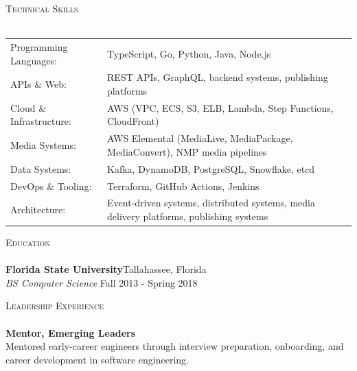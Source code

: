 \documentclass[a4paper]{article}
\newcommand{\lineunder} {
    \vspace*{-8pt} \\
    \hspace*{-18pt} \hrulefill \\
}
\newcommand{\header} [1] {
    {\hspace*{-18pt}\vspace*{6pt} \textsc{#1}}
    \vspace*{-6pt} \lineunder
}
\begin{document}
\header{Technical Skills}
\vspace{1mm}
\begin{tabular}{ l l }
    Programming Languages:      & TypeScript, Go, Python, Java, Node.js \\
    APIs \& Web:                & REST APIs, GraphQL, backend systems, publishing platforms \\
    Cloud \& Infrastructure:    & AWS (VPC, ECS, S3, ELB, Lambda, Step Functions, CloudFront) \\
    Media Systems:              & AWS Elemental (MediaLive, MediaPackage, MediaConvert), NMP media pipelines \\
    Data Systems:               & Kafka, DynamoDB, PostgreSQL, Snowflake, etcd \\
    DevOps \& Tooling:          & Terraform, GitHub Actions, Jenkins \\
    Architecture:               & Event-driven systems, distributed systems, media delivery platforms, publishing systems \\
\end{tabular}

\vspace{3mm}

\header{Education}
\textbf{Florida State University}\hfill Tallahassee, Florida\\
{\textit {BS Computer Science}} \hfill Fall 2013 - Spring 2018\\

\vspace{3mm}

\header{Leadership Experience}
\textbf{Mentor, Emerging Leaders}\\
Mentored early-career engineers through interview preparation, onboarding, and career development in software engineering. \\

\vfill
\end{document}
